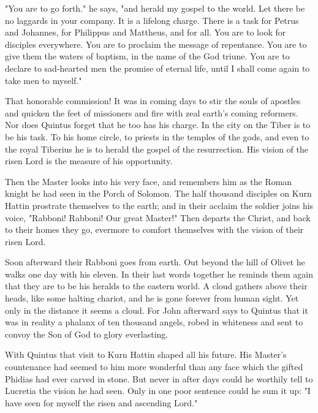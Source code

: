 "You are to go forth." he says, "and herald my gospel to the world.
Let there be no laggards in your company.  It is a lifelong charge.
There is a task for Petrus and Johannes, for Philippus and
Mattheus, and for all.  You are to look for disciples everywhere.
You are to proclaim the message of repentance.  You are to give
them the waters of baptism, in the name of the God triune.  You are
to declare to sad-hearted men the promise of eternal life, until I
shall come again to take men to myself."

That honorable commission!  It was in coming days to stir the souls
of apostles and quicken the feet of missioners and fire with zeal
earth's coming reformers.  Nor does Quintus forget that he too has
his charge.   In the city on the Tiber is to be his task.  To his
home circle, to priests in the temples of the gods, and even to the
royal Tiberius he is to herald the gospel of the resurrection.  His
vision of the risen Lord is the measure of his opportunity.

Then the Master looks into his very face, and remembers him as the
Roman knight he had seen in the Porch of Solomon.  The half
thousand disciples on Kurn Hattin prostrate themselves to the
earth; and in their acclaim the soldier joins his voice, "Rabboni!
Rabboni!  Our great Master!"  Then departs the Christ, and back to
their homes they go, evermore to comfort themselves with the vision
of their risen Lord.


Soon afterward their Rabboni goes from earth.  Out beyond the hill
of Olivet he walks one day with his eleven.  In their last words
together he reminds them again that they are to be his heralds to
the eastern world.  A cloud gathers above their heads, like some
halting chariot, and he is gone forever from human sight.  Yet only
in the distance it seems a cloud.  For John afterward says to
Quintus that it was in reality a phalanx of ten thousand angels,
robed in whiteness and sent to convoy the Son of God to glory
everlasting.

With Quintus that visit to Kurn Hattin shaped all his future.  His
Master's countenance had seemed to him more wonderful than any face
which the gifted Phidias had ever carved in stone.  But never in
after days could he worthily tell to Lucretia the vision he had
seen.  Only in one poor sentence could he sum it up: "I have seen
for myself the risen and ascending Lord."